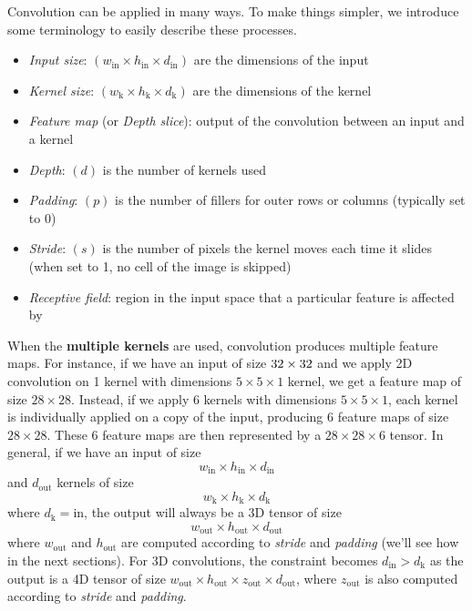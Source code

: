 \documentclass[a4paper, 12pt]{report}
\begin{document}
    Convolution can be applied in many ways. To make things simpler, we introduce some terminology to easily describe these processes.
    \begin{itemize}
        \item \textit{Input size}: $(w_{\mathrm{in}} \times h_{\mathrm{in}} \times d_{\mathrm{in}})$ are the dimensions of the input
        \item \textit{Kernel size}: $(w_{\mathrm{k}} \times h_{\mathrm{k}} \times d_{\mathrm{k}})$ are the dimensions of the kernel
        \item \textit{Feature map} (or \textit{Depth slice}): output of the convolution between an input and a kernel
        \item \textit{Depth}: $(d)$ is the number of kernels used
        \item \textit{Padding}: $(p)$ is the number of fillers for outer rows or columns (typically set to 0)
        \item \textit{Stride}: $(s)$ is the number of pixels the kernel moves each time it slides  (when set to 1, no cell of the image is skipped)
        \item \textit{Receptive field}: region in the input space that a particular feature is affected by 
    \end{itemize}

    When the \textbf{multiple kernels} are used, convolution produces multiple feature maps. For instance, if we have an input of size $32 \times 32 \time 1$ and we apply 2D convolution on 1 kernel with dimensions $5 \times 5 \times 1$ kernel, we get a feature map of size $28 \times 28$. Instead, if we apply 6 kernels with dimensions $5 \times 5 \times 1$, each kernel is individually applied on a copy of the input, producing 6 feature maps of size $28 \times 28$. These 6 feature maps are then represented by a $28 \times 28 \times 6$ tensor. In general, if we have an input of size
    \[w_{\mathrm{in}} \times h_{\mathrm{in}} \times d_{\mathrm{in}}\]
    and $d_{\mathrm{out}}$ kernels of size 
    \[w_{\mathrm{k}} \times h_{\mathrm{k}} \times d_{\mathrm{k}}\]
    where $d_\mathrm{k} = \mathrm{in}$, the output will always be a 3D tensor of size
    \[w_{\mathrm{out}} \times h_{\mathrm{out}} \times d_{\mathrm{out}}\]
    where $w_{\mathrm{out}}$ and $h_{\mathrm{out}}$ are computed according to \textit{stride} and \textit{padding} (we'll see how in the next sections). For 3D convolutions, the constraint becomes $d_\mathrm{in} > d_\mathrm{k}$ as the output is a 4D tensor of size $w_{\mathrm{out}} \times h_{\mathrm{out}} \times z_{\mathrm{out}} \times d_{\mathrm{out}}$,  where $z_{\mathrm{out}}$ is also computed according to \textit{stride} and \textit{padding}.
\end{document}
